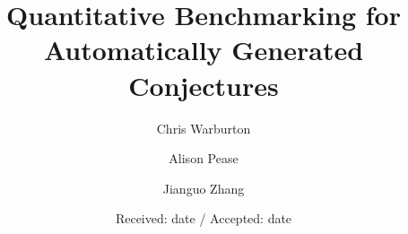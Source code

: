 \newcommand{\iE}{\textbf{E}}
\newcommand{\iN}{\textbf{N}}
\newcommand{\iS}{\textbf{S}}
\newcommand{\iA}{\textbf{A}}
\newcommand{\iC}{\textbf{C}}
\newcommand{\iU}{\textbf{U}}
\newcommand{\tIFF}{if-and-only-if}
\newcommand{\tNE}{non-exists}
\newcommand{\tIMP}{implies}
\newcommand{\tEQ}{equations}
\newcommand{\tINE}{inequalities}
\newcommand{\tCON}{conditional}
\newcommand{\tRow}[1]{#1 \\ \hline}




\title{Quantitative Benchmarking for Automatically Generated Conjectures%
}


\author{Chris Warburton \and
        Alison Pease    \and
        Jianguo Zhang
}



\date{Received: date / Accepted: date}

\maketitle



